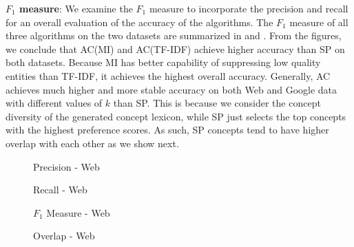 \textbf{$F_1$ measure}: We examine the $F_1$ measure to
incorporate the precision and recall for an overall
evaluation of the accuracy of the algorithms.
The $F_1$ measure of all three algorithms on the two datasets are summarized in
 and .
From the figures, we conclude that AC(MI) and AC(TF-IDF) achieve
higher accuracy than SP on both datasets.
Because MI has better capability of suppressing low quality entities
than TF-IDF, it achieves the highest overall accuracy.
Generally, AC achieves much higher and more stable accuracy
on both Web and Google data with different values of $k$ than SP.
This is because we consider the concept diversity of the generated concept
lexicon, while SP just selects the top concepts with the highest
preference scores. As such, SP concepts tend to have higher overlap
with each other as we show next.
\begin{figure*}[th]
\begin{minipage}[t]{0.5\columnwidth}
\centering
{}
\caption{Precision - Web}
\label{fig:precision_web}
\end{minipage}
\begin{minipage}[t]{0.5\columnwidth}
\centering
{}
\caption{Recall - Web}
\label{fig:recall_web}
\end{minipage}
\begin{minipage}[t]{0.5\columnwidth}
\centering
{}
\caption{$F_1$ Measure - Web}
\label{fig:f1_web}
\end{minipage}
\begin{minipage}[t]{0.5\columnwidth}
\centering
{}
\caption{Overlap - Web}
\label{fig:overlap_web}
\end{minipage}
\end{figure*}

